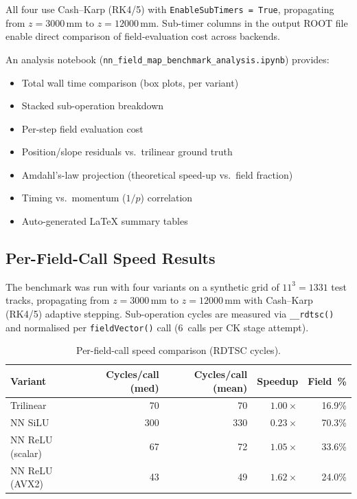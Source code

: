 \documentclass[11pt,a4paper]{article}
\newcommand{\SI}[2]{#1\,\text{#2}}
\newcommand{\num}[1]{#1}
\begin{document}
All four use Cash--Karp (RK4/5) with \texttt{EnableSubTimers = True},
propagating from $z = \SI{3000}{mm}$ to
$z = \SI{12000}{mm}$.  Sub-timer columns in the output ROOT file
enable direct comparison of field-evaluation cost across backends.

An analysis notebook
(\texttt{nn\_field\_map\_benchmark\_analysis.ipynb}) provides:
\begin{itemize}[nosep]
  \item Total wall time comparison (box plots, per variant)
  \item Stacked sub-operation breakdown
  \item Per-step field evaluation cost
  \item Position/slope residuals vs.\ trilinear ground truth
  \item Amdahl's-law projection (theoretical speed-up vs.\ field fraction)
  \item Timing vs.\ momentum ($1/p$) correlation
  \item Auto-generated \LaTeX{} summary tables
\end{itemize}

\subsection{Per-Field-Call Speed Results}

The benchmark was run with four variants on a synthetic grid of
$11^3 = \num{1331}$ test tracks, propagating from $z = \SI{3000}{mm}$ to
$z = \SI{12000}{mm}$ with Cash--Karp (RK4/5) adaptive stepping.
Sub-operation cycles are measured via \texttt{\_\_rdtsc()} and normalised
per \texttt{fieldVector()} call (6~calls per CK stage attempt).

\begin{table}[H]
\centering
\caption{Per-field-call speed comparison (RDTSC cycles).}
\label{tab:field_eval_speed}
\begin{tabular}{@{} l r r r r @{}}
\toprule
Variant & Cycles/call (med) & Cycles/call (mean) & Speedup & Field~\% \\
\midrule
Trilinear        &  70 &  70 & $1.00\times$ & 16.9\% \\
NN SiLU          & 300 & 330 & $0.23\times$ & 70.3\% \\
NN ReLU (scalar) &  67 &  72 & $1.05\times$ & 33.6\% \\
NN ReLU (AVX2)   &  43 &  49 & $1.62\times$ & 24.0\% \\
\bottomrule
\end{tabular}
\end{table}
\end{document}
